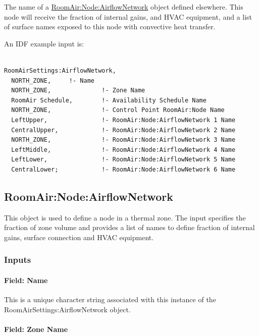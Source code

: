 The name of a \hyperref[roomairnodeairflownetwork]{RoomAir:Node:AirflowNetwork} object defined elsewhere. This node will receive the fraction of internal gains, and HVAC equipment, and a list of surface names exposed to this node with convective heat transfer.

An IDF example input is:

\begin{lstlisting}

RoomAirSettings:AirflowNetwork,
  NORTH_ZONE,     !- Name
  NORTH_ZONE,              !- Zone Name
  RoomAir Schedule,        !- Availability Schedule Name
  NORTH_ZONE,              !- Control Point RoomAir:Node Name
  LeftUpper,               !- RoomAir:Node:AirflowNetwork 1 Name
  CentralUpper,            !- RoomAir:Node:AirflowNetwork 2 Name
  NORTH_ZONE,              !- RoomAir:Node:AirflowNetwork 3 Name
  LeftMiddle,              !- RoomAir:Node:AirflowNetwork 4 Name
  LeftLower,               !- RoomAir:Node:AirflowNetwork 5 Name
  CentralLower;            !- RoomAir:Node:AirflowNetwork 6 Name
\end{lstlisting}

\subsection{RoomAir:Node:AirflowNetwork}\label{roomairnodeairflownetwork}

This object is used to define a node in a thermal zone. The input specifies the fraction of zone volume and provides a list of names to define fraction of internal gains, surface connection and HVAC equipment.

\subsubsection{Inputs}\label{inputs-13-012}

\paragraph{Field: Name}\label{field-name-8-017}

This is a unique character string associated with this instance of the Room\-Air\-Settings:\-Air\-flow\-Net\-work object.

\paragraph{Field: Zone Name}\label{field-zone-name-9-000}

